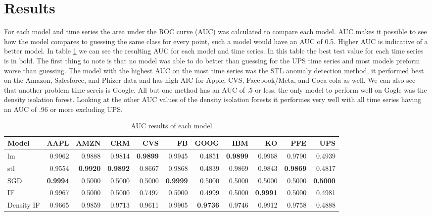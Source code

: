 \documentclass{article}
\begin{document}
\section{Results}

For each model and time series the area under the ROC curve (AUC) was calculated to compare each model. AUC makes it possible to see how the model compares to guessing the same class for every point, such a model would have an AUC of 0.5. Higher AUC is indicative of a better model. In table \ref{tab:auc} we can see the resulting AUC for each model and time series. In this table the best test value for each time series is in bold. The first thing to note is that no model was able to do better than guessing for the UPS time series and most models preform worse than guessing. The model with the highest AUC on the most time series was the STL anomaly detection method, it performed best on the Amazon, Salesforce, and Phizer data and has high AIC for Apple, CVS, Facebook/Meta, and Coca-cola as well. We can also see that another problem time sereis is Google. All but one method has an AUC of .5 or less, the only model to perform well on Gogle was the density isolation forest. Looking at the other AUC values of the density isolation forests it performes very well with all time series having an AUC of .96 or more excluding UPS.

\begin{table}[ht]
    \centering
    \caption{AUC results of each model}
    \label{tab:auc}
    \small
    \begin{tabular}{l|r|r|r|r|r|r|r|r|r|r}
        \hline
        Model & AAPL & AMZN & CRM & CVS & FB & GOOG & IBM & KO & PFE & UPS\\
        \hline
        lm & 0.9962 & 0.9888 & 0.9814 & \textbf{0.9899} & 0.9945 & 0.4851 & \textbf{0.9899} & 0.9968 & 0.9790 & 0.4939\\
        \hline
        stl & 0.9554 & \textbf{0.9920} & \textbf{0.9892} & 0.8667 & 0.9868 & 0.4839 & 0.9869 & 0.9843 & \textbf{0.9869} & 0.4817\\
        \hline
        SGD & \textbf{0.9994} & 0.5000 & 0.5000 & 0.5000 & \textbf{0.9999} & 0.5000 & 0.5000 & 0.5000 & 0.5000 & \textbf{0.5000}\\
        \hline
        IF & 0.9967 & 0.5000 & 0.5000 & 0.7497 & 0.5000 & 0.4999 & 0.5000 & \textbf{0.9991} & 0.5000 & 0.4981\\
        \hline
        Density IF & 0.9665 & 0.9859 & 0.9713 & 0.9611 & 0.9905 & \textbf{0.9736} & 0.9746 & 0.9912 & 0.9758 & 0.4888\\
        \hline
    \end{tabular}
\end{table}
\end{document}
